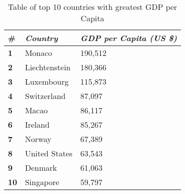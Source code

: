 \begin{table}[htbp]
\centering
\begin{tabular}{|l|l|l|}
\hline
\textbf{\#} & \textit{\textbf{Country}} & \textit{\textbf{GDP per Capita (US \$)}} \\ \hline
\textbf{1}  & Monaco                    & 190,512                                  \\ \hline
\textbf{2}  & Liechtenstein             & 180,366                                  \\ \hline
\textbf{3}  & Luxembourg                & 115,873                                  \\ \hline
\textbf{4}  & Switzerland               & 87,097                                   \\ \hline
\textbf{5}  & Macao                     & 86,117                                   \\ \hline
\textbf{6}  & Ireland                   & 85,267                                   \\ \hline
\textbf{7}  & Norway                    & 67,389                                   \\ \hline
\textbf{8}  & United States             & 63,543                                   \\ \hline
\textbf{9}  & Denmark                   & 61,063                                   \\ \hline
\textbf{10} & Singapore                 & 59,797                                   \\ \hline
\end{tabular}
\caption{Table of top 10 countries with greatest GDP per Capita}
\label{tab:tabelka}
\end{table}